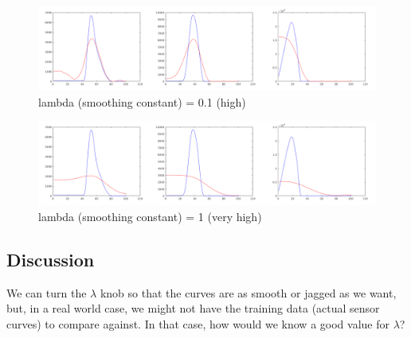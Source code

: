 \documentclass{article}
\begin{document}
\begin{figure}[!ht]
	\centering
	\includegraphics[width=160mm]{figs/sensors_smooth_lam0_1000_chanall.png}
	\caption{lambda (smoothing constant) = 0.1 (high)}
\end{figure}

\begin{figure}[!ht]
	\centering
	\includegraphics[width=160mm]{figs/sensors_smooth_lam1_0000_chanall.png}
	\caption{lambda (smoothing constant) = 1 (very high)}
\end{figure}

\subsection{Discussion}

We can turn the $\lambda$ knob so that the curves are as smooth or jagged as we want, but, 
in a real world case, we might not have the training data (actual sensor curves) 
to compare against. In that case, how would we know a good value for $\lambda$?
\end{document}
